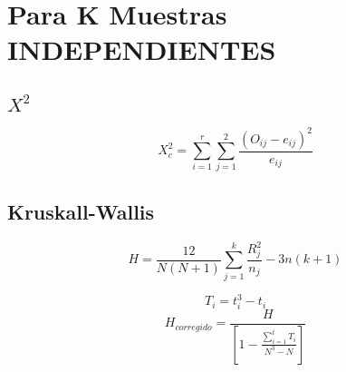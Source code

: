 \documentclass[12pt]{article}
\begin{document}
\section*{Para K Muestras INDEPENDIENTES}
\subsection*{$X^2$}
\begin{center}
\begin{tcolorbox}[colback=white,colframe=black,width=8.5cm ,coltitle=white]
$$
X^2_{c} = \sum^{r}_{i=1} \sum^{2}_{j=1} \frac{(O_{ij} - e_{ij})^2}{e_{ij}}$$
\end{tcolorbox}
\end{center}

\subsection*{Kruskall-Wallis}
\begin{center}
\begin{tcolorbox}[colback=white,colframe=black,width=8.5cm ,coltitle=white]
$$
H =\frac{12}{N(N+1)} \sum^{k}_{j=1} \frac{R^2_j}{n_j} - 3n(k+1)$$
\end{tcolorbox}
\end{center}


\begin{center}
\begin{tcolorbox}[colback=white,colframe=black,width=8.5cm ,coltitle=white]
$$T_i = t_i^3 - t_i$$
$$H_{corregido} =\frac{H}{\left[ 1- \frac{\sum\limits^{t}_{i=1} T_i}{N^3-N}\right]}$$
\end{tcolorbox}
\end{center}







\end{document}
